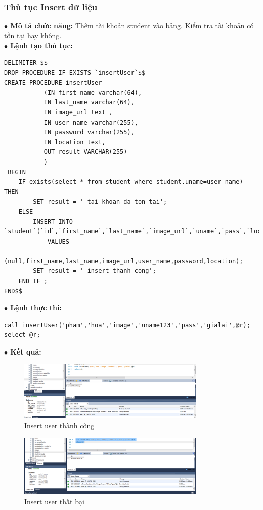 \documentclass[12pt,a4paper,titlepage]{article}
\begin{document}
\subsubsection{Thủ tục Insert dữ liệu}
\textbf{$\bullet$ Mô tả chức năng:} Thêm tài khoản student vào bảng. Kiểm tra tài khoản có tồn tại hay không. \\
\textbf{$\bullet$ Lệnh tạo thủ tục:}
\begin{lstlisting}
DELIMITER $$
DROP PROCEDURE IF EXISTS `insertUser`$$
CREATE PROCEDURE insertUser
           (IN first_name varchar(64),
           IN last_name varchar(64),
           IN image_url text ,
           IN user_name varchar(255),
           IN password varchar(255),
           IN location text,
           OUT result VARCHAR(255)
           )
 BEGIN
	IF exists(select * from student where student.uname=user_name)  THEN 
		SET result = ' tai khoan da ton tai';
	ELSE 
		INSERT INTO `student`(`id`,`first_name`,`last_name`,`image_url`,`uname`,`pass`,`location`)
			VALUES
			(null,first_name,last_name,image_url,user_name,password,location);
		SET result = ' insert thanh cong';
	END IF ;
END$$
\end{lstlisting}
\textbf{$\bullet$ Lệnh thực thi:}
\begin{lstlisting}
call insertUser('pham','hoa','image','uname123','pass','gialai',@r);
select @r;
\end{lstlisting}
\textbf{$\bullet$ Kết quả:}
\begin{figure}[h!]
	\centering
	\caption{Insert user thành công}
	\includegraphics[width=0.8\textwidth]{images/image5.png}
\end{figure}
\begin{figure}[h!]
	\centering
	\caption{Insert user thất bại}
	\includegraphics[width=0.8\textwidth]{images/image7.png}
\end{figure}
\end{document}
